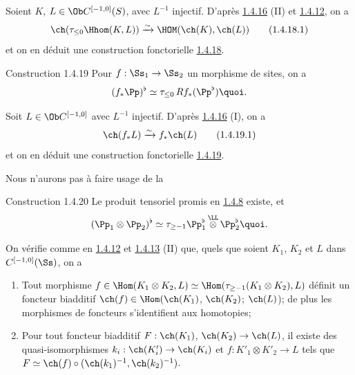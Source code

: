 Soient $K$, $L\in \Ob C^{[-1,0]}(S)$, avec $L^{-1}$ injectif. D'après
\hyperref[XVIII.lem1.4.16]{1.4.16} (II) et \hyperref[XVIII.subsubsec1.4.12]{1.4.12}, on a
\begin{equation*}
\ch(\tau_{\leq
0}\Hhom(K,L))\xrightarrow{\sim}\HOM(\ch(K),\ch(L))\tag{1.4.18.1}
\end{equation*}%
et on en déduit une construction fonctorielle \hyperref[XVIII.const1.4.18]{1.4.18}.

\begin{enonce*}[remark]{Construction 1.4.19}
Pour $f:\Ss_{1}\to\Ss_{2}$ un morphisme de sites, on a
$$
(f_{\ast}\Pp)^{\flat}\simeq \tau_{\leq
0}\,Rf_{\ast}(\Pp^{\flat}){\quoi}.
$$
\end{enonce*}

Soit $L\in \Ob C^{[-1,0]}$ avec $L^{-1}$ injectif. D'après
\hyperref[XVIII.lem1.4.16]{1.4.16} (I), on a 
\begin{equation*}
\ch(f_{\ast}L)\xrightarrow{\sim} f_{\ast}\ch(L)\tag{1.4.19.1}
\end{equation*}%
et on en déduit une construction fonctorielle \hyperref[XVIII.const1.4.19]{1.4.19}.

Nous n'aurons pas à faire usage de la

\begin{enonce*}[remark]{Construction 1.4.20}
Le produit tensoriel promis en \hyperref[XVIII.subsubsec1.4.8]{1.4.8} existe, et
$$
(\Pp_{1}\otimes \Pp_{2})^{\flat}\simeq \tau_{\geq
-1}\Pp^{\flat}_{1}\mathop{\otimes}^{\LL}\Pp^{\flat}_{2}{\quoi}.
$$
\end{enonce*}

On vérifie comme en \hyperref[XVIII.subsubsec1.4.12]{1.4.12} et
\hyperref[XVIII.lem1.4.13]{1.4.13} (II) que, quels que soient 
$K_{1}$, $K_{2}$ et $L$ dans $C^{[-1,0]}(\Ss)$, on a
\begin{enumerate}
\renewcommand{\theenumi}{\alph{enumi}}
\renewcommand{\labelenumi}{(\theenumi)}
\item Tout morphisme $f\in \Hom(K_{1}\otimes K_{2},L)\simeq
\Hom(\tau_{\geq-1}(K_{1}\otimes K_{2}),L)$ définit un foncteur
biadditif $\ch(f)\in \Hom(\ch(K_{1})$, $\ch(K_{2})$; $\ch(L)$); de
plus les morphismes de foncteurs s'identifient aux homotopies;

\item Pour tout foncteur biadditif $F:\ch(K_{1})$,
$\ch(K_{2})\rightarrow \ch(L)$, il existe des quasi-isomorphismes
$k_{i}:\ch(K'_{i})\rightarrow \ch(K_{i})$ et $f:K'_{1}\otimes
K'_{2}\rightarrow L$ tels que $F\simeq \ch(f)\circ
(\ch(k_{1})^{-1},\ch(k_{2})^{-1})$.
\end{enumerate}


